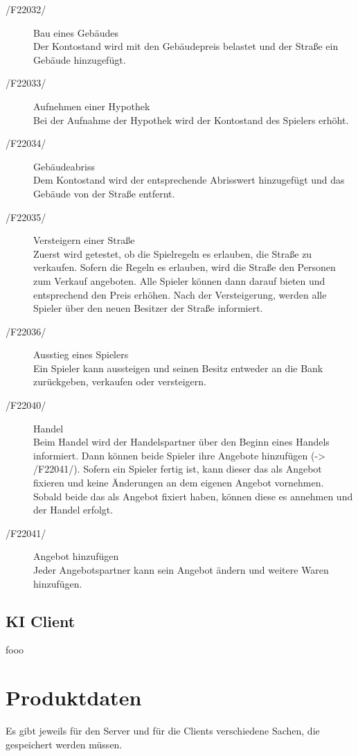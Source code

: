 \documentclass[a4paper,10pt]{article}
\begin{document}
\begin{description}
\item[/F22032/] Bau eines Gebäudes \\
Der Kontostand wird mit den Gebäudepreis belastet und der Straße ein Gebäude hinzugefügt.
\item[/F22033/] Aufnehmen einer Hypothek \\
Bei der Aufnahme der Hypothek wird der Kontostand des Spielers erhöht.
\item[/F22034/] Gebäudeabriss \\
Dem Kontostand wird der entsprechende Abrisswert hinzugefügt und das Gebäude von der Straße entfernt.
\item[/F22035/] Versteigern einer Straße \\
Zuerst wird getestet, ob die Spielregeln es erlauben, die Straße zu verkaufen. Sofern die Regeln es erlauben, wird die Straße den Personen zum Verkauf angeboten. Alle Spieler können dann darauf bieten und entsprechend den Preis erhöhen. Nach der Versteigerung, werden alle Spieler über den neuen Besitzer der Straße informiert.
\item[/F22036/] Ausstieg eines Spielers \\
Ein Spieler kann aussteigen und seinen Besitz entweder an die Bank zurückgeben, verkaufen oder versteigern.
\item[/F22040/] Handel \\
Beim Handel wird der Handelspartner über den Beginn eines Handels informiert. Dann können beide Spieler ihre Angebote hinzufügen (-> /F22041/). Sofern ein Spieler fertig ist, kann dieser das als Angebot fixieren und keine Änderungen an dem eigenen Angebot vornehmen. Sobald beide das als Angebot fixiert haben, können diese es annehmen und der Handel erfolgt.
\item[/F22041/] Angebot hinzufügen \\
Jeder Angebotspartner kann sein Angebot ändern und weitere Waren hinzufügen.
\end{description}
\subsection{KI Client}
\begin{description}
\item fooo
\end{description}
\section{Produktdaten}
Es gibt jeweils für den Server und für die Clients verschiedene Sachen, die gespeichert werden müssen.
\end{document}
